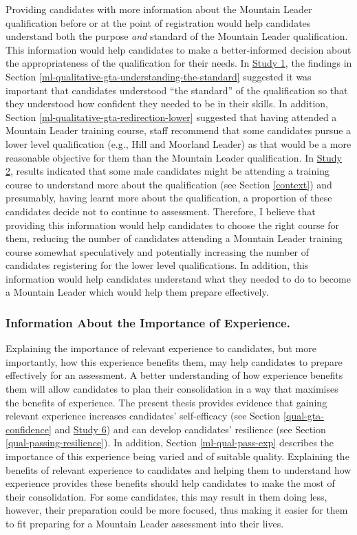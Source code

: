 \documentclass[
  12pt,
  a4paper,
]{book}
\begin{document}
Providing candidates with more information about the Mountain Leader qualification before or at the point of registration would help candidates understand both the purpose \emph{and} standard of the Mountain Leader qualification. This information would help candidates to make a better-informed decision about the appropriateness of the qualification for their needs. In \protect\hyperlink{ml-qualitative}{Study 1}, the findings in Section \ref{ml-qualitative-gta-understanding-the-standard} suggested it was important that candidates understood ``the standard'' of the qualification so that they understood how confident they needed to be in their skills. In addition, Section \ref{ml-qualitative-gta-redirection-lower} suggested that having attended a Mountain Leader training course, staff recommend that some candidates pursue a lower level qualification (e.g., Hill and Moorland Leader) as that would be a more reasonable objective for them than the Mountain Leader qualification. In \protect\hyperlink{male-gta}{Study 2}, results indicated that some male candidates might be attending a training course to understand more about the qualification (see Section \ref{context}) and presumably, having learnt more about the qualification, a proportion of these candidates decide not to continue to assessment. Therefore, I believe that providing this information would help candidates to choose the right course for them, reducing the number of candidates attending a Mountain Leader training course somewhat speculatively and potentially increasing the number of candidates registering for the lower level qualifications. In addition, this information would help candidates understand what they needed to do to become a Mountain Leader which would help them prepare effectively.

\hypertarget{information-about-the-importance-of-experience.}{%
\subsubsection{Information About the Importance of Experience.}\label{information-about-the-importance-of-experience.}}

Explaining the importance of relevant experience to candidates, but more importantly, how this experience benefits them, may help candidates to prepare effectively for an assessment. A better understanding of how experience benefits them will allow candidates to plan their consolidation in a way that maximises the benefits of experience. The present thesis provides evidence that gaining relevant experience increases candidates' self-efficacy (see Section \ref{qual-gta-confidence} and \protect\hyperlink{study-6}{Study 6}) and can develop candidates' resilience (see Section \ref{qual-passing-resilience}). In addition, Section \ref{ml-qual-pass-exp} describes the importance of this experience being varied and of suitable quality. Explaining the benefits of relevant experience to candidates and helping them to understand how experience provides these benefits should help candidates to make the most of their consolidation. For some candidates, this may result in them doing less, however, their preparation could be more focused, thus making it easier for them to fit preparing for a Mountain Leader assessment into their lives.
\end{document}
